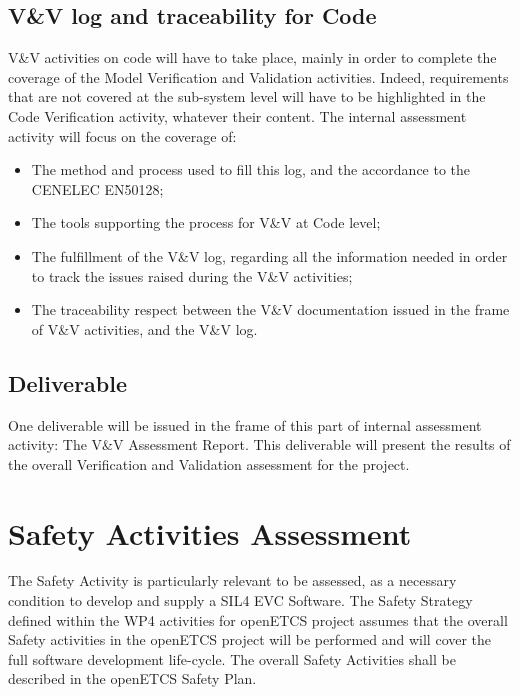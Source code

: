 \documentclass[openetcs]{template/openetcs_article}
\begin{document}
\subsection{V\&V log and traceability for Code}
V\&V activities on code will have to take place, mainly in order to complete the coverage of the Model Verification and Validation activities. Indeed,
requirements that are not covered at the sub-system level will have to be highlighted in the Code Verification activity, whatever their content.
The internal assessment activity will focus on the coverage of:
\begin{itemize}
\item The method and process used to fill this log, and the accordance to the CENELEC EN50128;
\item The tools supporting the process for V\&V at Code level;
\item The fulfillment of the V\&V log, regarding all the information needed in order to track the issues raised during the V\&V activities;
\item The traceability respect between the V\&V documentation issued in the frame of V\&V activities, and the V\&V log.
\end{itemize}

\subsection{Deliverable}
One deliverable will be issued in the frame of this part of internal assessment activity: The V\&V Assessment Report. This deliverable will present the results
of the overall Verification and Validation assessment for the project.

\section{Safety Activities Assessment}
The Safety Activity is particularly relevant to be assessed, as a necessary condition to develop and supply a SIL4 EVC Software. The Safety Strategy defined
within the WP4 activities for openETCS project assumes that the overall Safety activities in the openETCS project will be performed and will cover the full software development life-cycle.
The overall Safety Activities shall be described in the openETCS Safety Plan.
\end{document}
